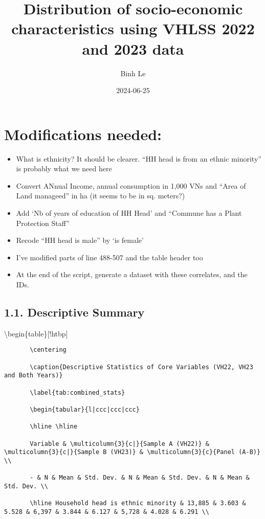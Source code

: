 \documentclass[
]{article}
\title{Distribution of socio-economic characteristics using VHLSS 2022
and 2023 data}
\author{Binh Le}
\date{2024-06-25}
\providecommand{\tightlist}{%
  \setlength{\itemsep}{0pt}\setlength{\parskip}{0pt}}
\begin{document}
\maketitle

\hypertarget{modifications-needed}{%
\section{Modifications needed:}\label{modifications-needed}}

\begin{itemize}
\tightlist
\item
  What is ethnicity? It should be clearer. ``HH head is from an ethnic
  minority'' is probably what we need here
\item
  Convert ANnual Income, annual consumption in 1,000 VNs and ``Area of
  Land manageed'' in ha (it seems to be in sq. meters?)
\item
  Add `Nb of years of education of HH Head' and ``Commune has a Plant
  Protection Staff''
\item
  Recode ``HH head is male'' by `is female'
\item
  I've modified parts of line 488-507 and the table header too
\item
  At the end of the script, generate a dataset with these correlates,
  and the IDs.
\end{itemize}

\hypertarget{descriptive-summary}{%
\subsection{1.1. Descriptive Summary}\label{descriptive-summary}}

\textbackslash begin\{table\}{[}!htbp{]}

\begin{verbatim}
       \centering

       \caption{Descriptive Statistics of Core Variables (VH22, VH23 and Both Years)}

       \label{tab:combined_stats}

       \begin{tabular}{l|ccc|ccc|ccc}

       \hline \hline

       Variable & \multicolumn{3}{c|}{Sample A (VH22)} & \multicolumn{3}{c|}{Sample B (VH23)} & \multicolumn{3}{c}{Panel (A-B)} \\

       - & N & Mean & Std. Dev. & N & Mean & Std. Dev. & N & Mean & Std. Dev. \\

       \hline Household head is ethnic minority & 13,885 & 3.603 & 5.528 & 6,397 & 3.844 & 6.127 & 5,728 & 4.028 & 6.291 \\ 
\end{verbatim}
\end{document}
